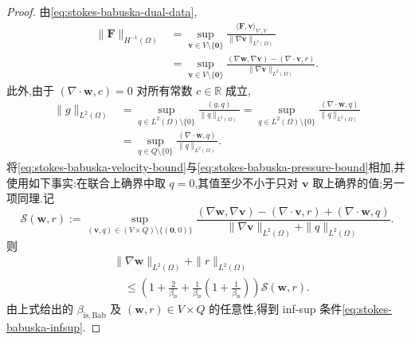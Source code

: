 \begin{proof}
由\cref{eq:stokes-babuska-dual-data},
\[
\begin{aligned}
  \|\bm{F}\|_{H^{-1}(\Omega)}
   &=\sup_{\bm{v}\in V\setminus\{\bm{0}\}}
       \frac{\langle\bm{F},\bm{v}\rangle_{V',V}}
            {\|\nabla\bm{v}\|_{L^2(\Omega)}}\\
   &=\sup_{\bm{v}\in V\setminus\{\bm{0}\}}
       \frac{(\nabla\bm{w},\nabla\bm{v})
                    -(\nabla\cdot\bm{v},r)}
            {\|\nabla\bm{v}\|_{L^2(\Omega)}}.
\end{aligned}
\]
此外,由于 $(\nabla\cdot\bm{w},c)=0$ 对所有常数 $c\in\mathbb{R}$ 成立,
\[
\begin{aligned}
  \|g\|_{L^2(\Omega)}
   &=\sup_{q\in L^2(\Omega)\setminus\{0\}}
       \frac{(g,q)}{\|q\|_{L^2(\Omega)}}
    =\sup_{q\in L^2(\Omega)\setminus\{0\}}
       \frac{(\nabla\cdot\bm{w},q)}{\|q\|_{L^2(\Omega)}}\\
   &=\sup_{q\in Q\setminus\{0\}}
       \frac{(\nabla\cdot\bm{w},q)}{\|q\|_{L^2(\Omega)}}.
\end{aligned}
\]
将\cref{eq:stokes-babuska-velocity-bound}与\cref{eq:stokes-babuska-pressure-bound}相加,并使用如下事实:在联合上确界中取 $q=0$,其值至少不小于只对 $\bm{v}$ 取上确界的值;另一项同理.记
\[
\mathcal{S}(\bm{w},r)
 :=\sup_{(\bm{v},q)\in(V\times Q)\setminus\{(\bm{0},0)\}}
   \frac{(\nabla\bm{w},\nabla\bm{v})
       -(\nabla\cdot\bm{v},r)
       +(\nabla\cdot\bm{w},q)}
        {\|\nabla\bm{v}\|_{L^2(\Omega)}+\|q\|_{L^2(\Omega)}}.
\]
则
\[
\begin{aligned}
  &\|\nabla\bm{w}\|_{L^2(\Omega)}+\|r\|_{L^2(\Omega)}\\
  &\quad\leq
   \left(1+\frac{2}{\beta_{\mathrm{is}}}
       +\frac{1}{\beta_{\mathrm{is}}}
          \left(1+\frac{1}{\beta_{\mathrm{is}}}\right)\right)
       \mathcal{S}(\bm{w},r).
\end{aligned}
\]
由上式给出的 $\beta_{\mathrm{is,Bab}}$ 及 $(\bm{w},r)\in V\times Q$ 的任意性,得到 inf-sup 条件\cref{eq:stokes-babuska-infsup}.
\end{proof}

